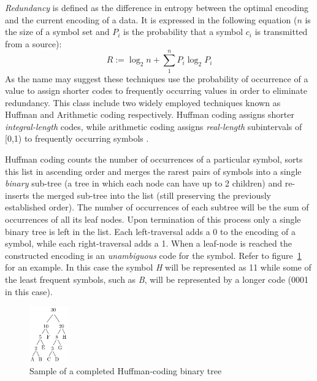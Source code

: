 \textit{Redundancy} is defined as the difference in entropy between the optimal encoding and the current encoding of a data. It is expressed in the following equation  
($n$ is the size of a symbol set and $P_{i}$ is the probability that a symbol $c_{i}$ is transmitted from a source)\cite[p. 46 - 47]{salomon2004data}:
\begin{equation}
 R := \log_2n + \sum_1^nP_i\log_2P_i
\end{equation}
As the name may suggest these techniques use the probability of occurrence of a value to assign shorter codes to frequently occurring values in order to eliminate redundancy. This 
class include two widely employed techniques known as Huffman and Arithmetic coding respectively. Huffman coding assigns shorter \textit{integral-length} codes, while arithmetic 
coding assigns \textit{real-length} subintervals of [0,1) to frequently occurring symbols \cite{Witten:1987:ACD:214762.214771}\cite[ch. 2]{salomon2004data}.

Huffman coding counts the number of occurrences of a particular symbol, sorts this list in ascending order and merges the rarest pairs of symbols into a single \textit{binary} 
sub-tree (a tree in which each node can have up to 2 children) and re-inserts the merged sub-tree into the list (still preserving the previously established order). The number of occurrences 
of each subtree will be the sum of occurrences of all its leaf nodes. Upon termination of this process only a single binary tree is left in the list. Each left-traversal adds a 0 to the encoding 
of a symbol, while each right-traversal adds a 1. When a leaf-node is reached the constructed encoding is an \textit{unambiguous} code for the symbol. Refer to figure~\ref{HUFFMAN} for an example.
In this case the symbol \textit{H} will be represented as 11 while some of the least frequent symbols, such as \textit{B}, will be represented by a longer code (0001 in this case).
\begin{figure}[h!]
\begin{mdframed}
 \centering
 \includegraphics[width=0.15\textwidth]{huffmanTree.png}
 \caption{Sample of a completed Huffman-coding binary tree \cite[p. 70]{salomon2004data}}
 \label{HUFFMAN}
\end{mdframed}
\end{figure}


